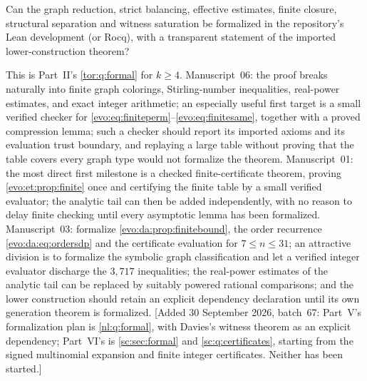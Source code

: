 \documentclass[11pt,a4paper]{article}
\numberwithin{equation}{section}
\theoremstyle{definition}
\theoremstyle{remark}
\begin{document}
\begin{question}\label{evo:q:formal}
Can the graph reduction, strict balancing, effective estimates, finite
closure, structural separation and witness saturation be formalized in the
repository's Lean development (or Rocq), with a transparent statement of the
imported lower-construction theorem?
\end{question}
This is Part~II's \cref{tor:q:formal} for $k\ge4$. Manuscript~06: the proof
breaks naturally into finite graph colorings, Stirling-number inequalities,
real-power estimates, and exact integer arithmetic; an especially useful
first target is a small verified checker for
\eqref{evo:eq:finiteperm}--\eqref{evo:eq:finitesame}, together with a proved
compression lemma; such a checker should report its imported axioms and its
evaluation trust boundary, and replaying a large table without proving that
the table covers every graph type would not formalize the theorem.
Manuscript~01: the most direct first milestone is a checked
finite-certificate theorem, proving \cref{evo:et:prop:finite} once and
certifying the finite table by a small verified evaluator; the analytic tail
can then be added independently, with no reason to delay finite checking
until every asymptotic lemma has been formalized. Manuscript~03: formalize
\cref{evo:da:prop:finitebound}, the order recurrence \eqref{evo:da:eq:ordersdp}
and the certificate evaluation for $7\le n\le31$; an attractive division is to
formalize the symbolic graph classification and let a verified integer
evaluator discharge the $3{,}717$ inequalities; the real-power estimates of
the analytic tail can be replaced by suitably powered rational comparisons;
and the lower construction should retain an explicit dependency declaration
until its own generation theorem is formalized.
[Added 30 September 2026, batch~67: Part~V's formalization plan is \cref{nl:q:formal}, with
Davies's witness theorem as an explicit dependency; Part~VI's is
\cref{sc:sec:formal} and \cref{sc:q:certificates}, starting from the signed
multinomial expansion and finite integer certificates. Neither has been
started.]
\end{document}
